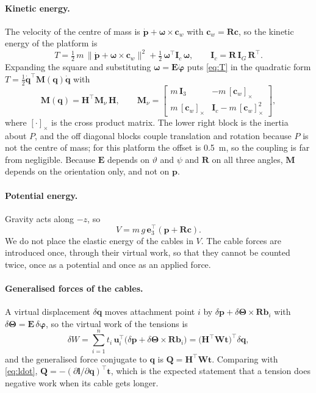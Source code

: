 \documentclass[10pt]{article}
\newcommand{\vc}[1]{\bm{#1}}
\newcommand{\mt}[1]{\mathbf{#1}}
\newcommand{\sk}[1]{[#1]_{\times}}
\newcommand{\eye}{\mt{I}}
\begin{document}
\paragraph{Kinetic energy.} The velocity of the centre of mass is $\dot{\vc p}+\vc\omega\times\vc c_w$ with $\vc c_w=\mt R\vc c$, so the kinetic energy of the platform is
\begin{equation}\label{eq:T}
T=\tfrac12\,m\,\lVert\dot{\vc p}+\vc\omega\times\vc c_w\rVert^2+\tfrac12\,\vc\omega^\top\mt I_c\,\vc\omega,\qquad \mt I_c=\mt R\,\mt I_G\,\mt R^\top .
\end{equation}
Expanding the square and substituting $\vc\omega=\mt E\dot{\vc\varphi}$ puts \eqref{eq:T} in the quadratic form $T=\tfrac12\dot{\vc q}^\top\mt M(\vc q)\dot{\vc q}$ with
\begin{equation}\label{eq:M}
\mt M(\vc q)=\mt H^\top\mt M_\nu\,\mt H,\qquad
\mt M_\nu=\begin{bmatrix} m\,\eye_3 & -m\,\sk{\vc c_w}\\ m\,\sk{\vc c_w} & \mt I_c-m\,\sk{\vc c_w}^2\end{bmatrix},
\end{equation}
where $\sk{\cdot}$ is the cross product matrix. The lower right block is the inertia about $P$, and the off diagonal blocks couple translation and rotation because $P$ is not the centre of mass; for this platform the offset is 0.5~m, so the coupling is far from negligible. Because $\mt E$ depends on $\vartheta$ and $\psi$ and $\mt R$ on all three angles, $\mt M$ depends on the orientation only, and not on $\vc p$.

\paragraph{Potential energy.} Gravity acts along $-z$, so
\begin{equation}\label{eq:V}
V=m\,g\,\vc e_3^\top(\vc p+\mt R\vc c).
\end{equation}
We do not place the elastic energy of the cables in $V$. The cable forces are introduced once, through their virtual work, so that they cannot be counted twice, once as a potential and once as an applied force.

\paragraph{Generalised forces of the cables.} A virtual displacement $\delta\vc q$ moves attachment point $i$ by $\delta\vc p+\delta\vc\Theta\times\mt R\vc b_i$ with $\delta\vc\Theta=\mt E\,\delta\vc\varphi$, so the virtual work of the tensions is
\begin{equation}\label{eq:Q}
\delta W=\sum_{i=1}^{n} t_i\,\vc u_i^\top\big(\delta\vc p+\delta\vc\Theta\times\mt R\vc b_i\big)=\big(\mt H^\top\mt W\vc t\big)^{\!\top}\delta\vc q,
\end{equation}
and the generalised force conjugate to $\vc q$ is $\vc Q=\mt H^\top\mt W\vc t$. Comparing with \eqref{eq:ldot}, $\vc Q=-(\partial\vc l/\partial\vc q)^\top\vc t$, which is the expected statement that a tension does negative work when its cable gets longer.
\end{document}
